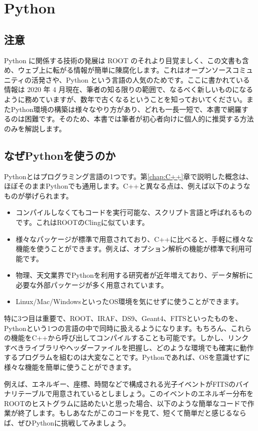 \chapter{Python}
\label{chap:Python}

\section{注意}
Python に関係する技術の発展は ROOT のそれより目覚ましく、この文書も含め、ウェブ上に転がる情報が簡単に陳腐化します。これはオープンソースコミュニティの活発さや、Python という言語の人気のためです。ここに書かれている情報は 2020 年 4 月現在、筆者の知る限りの範囲で、なるべく新しいものになるように務めていますが、数年で古くなるということを知っておいてください。またPython環境の構築は様々なやり方があり、どれも一長一短で、本書で網羅するのは困難です。そのため、本書では筆者が初心者向けに個人的に推奨する方法のみを解説します。

\section{なぜPythonを使うのか}

Pythonとはプログラミング言語の1つです。第\ref{chap:C++}章で説明した概念は、ほぼそのままPythonでも通用します。C++と異なる点は、例えば以下のようなものが挙げられます。
\begin{itemize}
  \item コンパイルしなくてもコードを実行可能な、スクリプト言語と呼ばれるものです。これはROOTのClingに似ています。
  \item 様々なパッケージが標準で用意されており、C++に比べると、手軽に様々な機能を使うことができます。例えば、オプション解析の機能が標準で利用可能です。
  \item 物理、天文業界でPythonを利用する研究者が近年増えており、データ解析に必要な外部パッケージが多く用意されています。
  \item Linux/Mac/WindowsといったOS環境を気にせずに使うことができます。
\end{itemize}
特に3つ目は重要で、ROOT、IRAF、DS9、Geant4、FITSといったものを、Pythonという1つの言語の中で同時に扱えるようになります。もちろん、これらの機能をC++から呼び出してコンパイルすることも可能です。しかし、リンクすべきライブラリやヘッダーファイルを把握し、どのような環境でも確実に動作するプログラムを組むのは大変なことです。Pythonであれば、OSを意識せずに様々な機能を簡単に使うことができます。

例えば、エネルギー、座標、時間などで構成される光子イベントがFITSのバイナリテーブルで用意されているとしましょう。このイベントのエネルギー分布をROOTのヒストグラムに詰めたいと思った場合、以下のような簡単なコードで作業が終了します。もしあなたがこのコードを見て、短くて簡単だと感じるならば、ぜひPythonに挑戦してみましょう。

